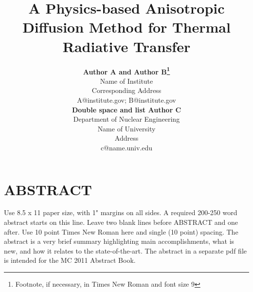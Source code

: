 \documentclass[11pt,letter,twoside]{mc2011}
\begin{document}
\title{A Physics-based Anisotropic Diffusion Method for Thermal Radiative
Transfer}

\author{
\textbf{Author A and Author B\footnote{Footnote, if necessary, in Times New Roman and font size 9}}\\
Name of Institute\\
Corresponding Address\\
A@institute.gov; B@institute.gov \vspace{1.0em} \\ 
\textbf{Double space and list Author C}\\
Department of Nuclear Engineering\\
Name of University\\
Address\\
c@name.univ.edu
}

\maketitle

\thispagestyle{empty}

\section*{ABSTRACT}

\small

Use 8.5 x 11 paper size, with 1" margins on all sides. A required 200-250 word abstract starts on this line.  Leave two blank lines before ABSTRACT and one after.  Use 10 point Times New Roman here and single (10 point) spacing.  The abstract is a very brief summary highlighting main accomplishments, what is new, and how it relates to the state-of-the-art.  The abstract in a separate pdf file is intended for the MC 2011 Abstract Book.

\end{document}

